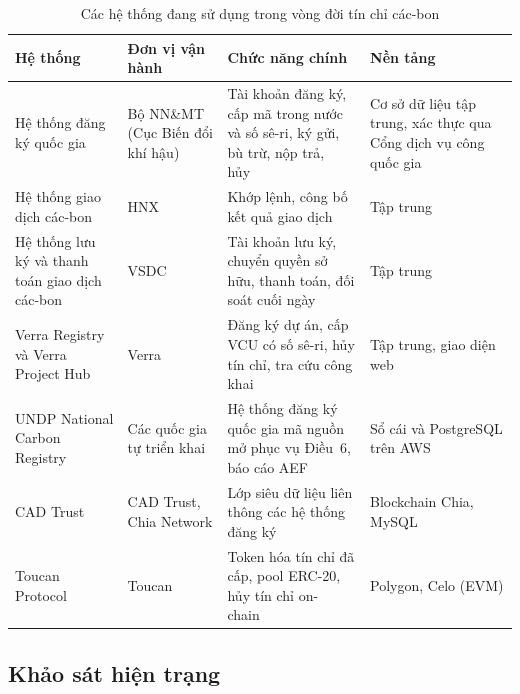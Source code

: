 \begin{table}[htbp]
    \centering
    \caption{Các hệ thống đang sử dụng trong vòng đời tín chỉ các-bon}
    \label{tab:ks-hethong}
    \small
    \renewcommand{\arraystretch}{1.2}
    \begin{tabularx}{\textwidth}{|p{3.1cm}|p{2.6cm}|X|p{2.6cm}|}
        \hline
        \textbf{Hệ thống} & \textbf{Đơn vị vận hành} & \textbf{Chức năng chính} & \textbf{Nền tảng} \\
        \hline
        Hệ thống đăng ký quốc gia & Bộ NN\&MT (Cục Biến đổi khí hậu) & Tài khoản đăng ký, cấp mã trong nước và số sê-ri, ký gửi, bù trừ, nộp trả, hủy~\cite{vietnam2026thongtu11} & Cơ sở dữ liệu tập trung, xác thực qua Cổng dịch vụ công quốc gia \\
        \hline
        Hệ thống giao dịch các-bon & HNX & Khớp lệnh, công bố kết quả giao dịch~\cite{vietnam2026nghidinh29} & Tập trung \\
        \hline
        Hệ thống lưu ký và thanh toán giao dịch các-bon & VSDC & Tài khoản lưu ký, chuyển quyền sở hữu, thanh toán, đối soát cuối ngày~\cite{vietnam2026nghidinh29} \cite{vietnam2026thongtu11} & Tập trung \\
        \hline
        Verra Registry và Verra Project Hub & Verra & Đăng ký dự án, cấp VCU có số sê-ri, hủy tín chỉ, tra cứu công khai~\cite{verra2024vcs} \cite{verra2024projecthub} & Tập trung, giao diện web \\
        \hline
        UNDP National Carbon Registry & Các quốc gia tự triển khai & Hệ thống đăng ký quốc gia mã nguồn mở phục vụ Điều~6, báo cáo AEF~\cite{undp2024nationalregistry} & Sổ cái và PostgreSQL trên AWS \\
        \hline
        CAD Trust & CAD Trust, Chia Network & Lớp siêu dữ liệu liên thông các hệ thống đăng ký~\cite{cadtrust2025datamodel} & Blockchain Chia, MySQL \\
        \hline
        Toucan Protocol & Toucan & Token hóa tín chỉ đã cấp, pool ERC-20, hủy tín chỉ on-chain~\cite{toucan2025docs} & Polygon, Celo (EVM) \\
        \hline
    \end{tabularx}
\end{table}

\FloatBarrier
\subsection*{Khảo sát hiện trạng}
\label{subsec:ks-hientrang}

